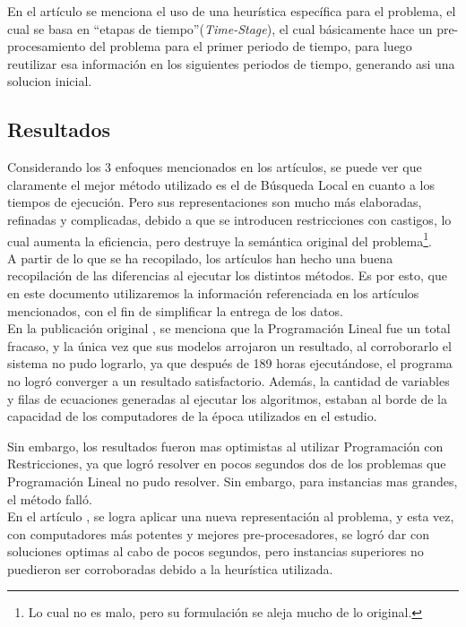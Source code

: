 \documentclass[letter, 10pt]{article}
\begin{document}
En el artículo \cite{PPPAsMIP} se menciona el uso de una heurística específica para el problema, el cual se basa en ``etapas de tiempo''(\textit{Time-Stage}), el cual básicamente hace un pre-procesamiento del problema para el primer periodo de tiempo, para luego reutilizar esa información en los siguientes periodos de tiempo, generando asi una solucion inicial.


\subsection{Resultados}
Considerando los 3 enfoques mencionados en los artículos, se puede ver que claramente el mejor método utilizado es el de Búsqueda Local en cuanto a los tiempos de ejecución. Pero sus representaciones son mucho más elaboradas, refinadas y complicadas, debido a que se introducen restricciones con castigos, lo cual aumenta la eficiencia, pero destruye la semántica original del problema\footnote{Lo cual no es malo, pero su formulación se aleja mucho de lo original.}.\\

A partir de lo que se ha recopilado, los artículos \cite{LocalSearch, PPPAsMIP} han hecho una buena recopilación de las diferencias al ejecutar los distintos métodos. Es por esto, que en este documento utilizaremos la información referenciada en los artículos mencionados, con el fin de simplificar la entrega de los datos.\\

En la publicación original \cite{FirstPublication}, se menciona que la Programación Lineal fue un total fracaso, y la única vez que sus modelos arrojaron un resultado, al corroborarlo el sistema no pudo lograrlo, ya que después de 189 horas ejecutándose, el programa no logró converger a un resultado satisfactorio. Además, la cantidad de variables y filas de ecuaciones generadas al ejecutar los algoritmos, estaban al borde de la capacidad de los computadores de la época utilizados en el estudio.

Sin embargo, los resultados fueron mas optimistas al utilizar Programación con Restricciones, ya que logró resolver en pocos segundos dos de los problemas que Programación Lineal no pudo resolver. Sin embargo, para instancias mas grandes, el método falló.\\

En el artículo \cite{PPPAsMIP}, se logra aplicar una nueva representación al problema, y esta vez, con computadores más potentes y mejores pre-procesadores, se logró dar con soluciones optimas al cabo de pocos segundos, pero instancias superiores no puedieron ser corroboradas debido a la heurística utilizada.
\end{document}
